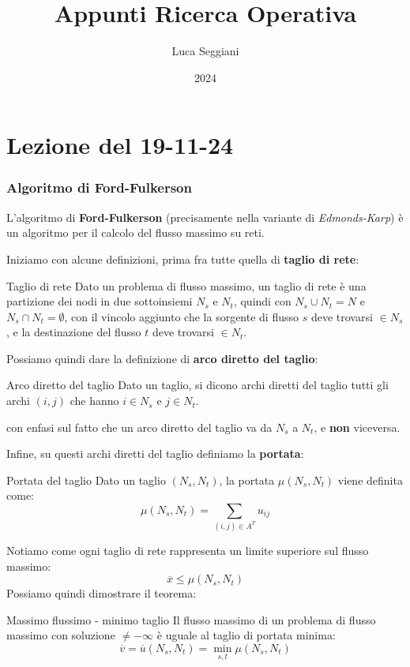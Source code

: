 \documentclass[a4paper,11pt]{article}
\title{Appunti Ricerca Operativa}
\author{Luca Seggiani}
\date{2024}
\begin{document}
\section{Lezione del 19-11-24}

\thispagestyle{empty}
\pagestyle{fancy}

\subsubsection{Algoritmo di Ford-Fulkerson}
L'algoritmo di \textbf{Ford-Fulkerson} (precisamente nella variante di \textit{Edmonds-Karp}) è un algoritmo per il calcolo del flusso massimo su reti.

Iniziamo con alcune definizioni, prima fra tutte quella di \textbf{taglio di rete}:
\begin{definition}{Taglio di rete}
	Dato un problema di flusso massimo, un taglio di rete è una partizione dei nodi in due sottoinsiemi $N_s$ e $N_t$, quindi con $N_s \cup N_t = N$ e $N_s \cap N_t = \emptyset$, con il vincolo aggiunto che la sorgente di flusso $s$ deve trovarsi $\in N_s$, e la destinazione del flusso $t$ deve trovarsi $\in N_t$.
\end{definition}

Possiamo quindi dare la definizione di \textbf{arco diretto del taglio}:
\begin{definition}{Arco diretto del taglio}
	Dato un taglio, si dicono archi diretti del taglio tutti gli archi $(i,j)$ che hanno $i \in N_s$ e $j \in N_t$.
\end{definition}
con enfasi sul fatto che un arco diretto del taglio va da $N_s$ a $N_t$, e \textbf{non} viceversa.

Infine, su questi archi diretti del taglio definiamo la \textbf{portata}:
\begin{definition}{Portata del taglio}
	Dato un taglio $(N_s, N_t)$, la portata $\mu(N_s, N_t)$ viene definita come:
	$$
		\mu(N_s, N_t) = \sum_{(i,j) \in A^T} u_{ij}
	$$
\end{definition}

Notiamo come ogni taglio di rete rappresenta un limite superiore sul flusso massimo:
	$$
		\overline{x} \leq \mu(N_s, N_t)
	$$
Possiamo quindi dimostrare il teorema:
\begin{theorem}{Massimo flussimo - minimo taglio}
	Il flusso massimo di un problema di flusso massimo con soluzione $\neq -\infty$ è uguale al taglio di portata minima:
	$$
		\overline{v} = \overline{u}(N_s, N_t) = \min_{s, t} \mu(N_s, N_t)
	$$
\end{theorem}
\end{document}
